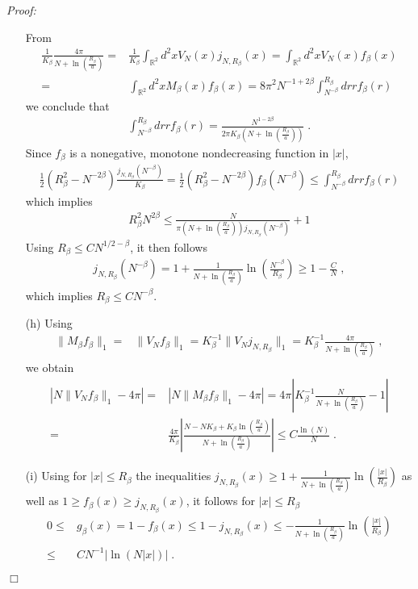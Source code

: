 \documentclass[11pt, english, american]{article}
\newenvironment{proof}{\emph{Proof:}}{\begin{flushright} $ \Box $ \end{flushright}}
\begin{document}
\begin{proof}
\begin{enumerate}
From
\begin{align*}
\frac{1}{K_\beta} \frac{4 \pi}{N+ \ln \left(\frac{R_\beta}{a}\right)}
=&
\frac{1}{K_\beta}
\int_{\mathbb{R}^2}d^2x V_N(x) j_{N,R_\beta}(x)
=
\int_{\mathbb{R}^2}d^2x V_N(x) f_\beta(x)
\\
=&
\int_{\mathbb{R}^2}d^2x M_\beta(x) f_\beta(x)
= 
8 \pi^2 N^{-1+2 \beta} 
\int_{N^{-\beta}}^{R_\beta} 
dr r f_\beta(r)
\end{align*}
we conclude that
\begin{align*}
\int_{N^{-\beta}}^{R_\beta} 
dr r f_\beta(r)
=
\frac{N^{1- 2 \beta}}{2 \pi K_\beta
\left(
N+ \ln \left(\frac{R_\beta}{a} \right)
\right)
} 
\;.
\end{align*}
Since $f_\beta$ is a nonegative, monotone nondecreasing function in $|x|$, 
\begin{align*}
\frac{1}{2}( R_\beta^2- N^{-2 \beta})
\frac{j_{N,R_\beta}(N^{-\beta})}{K_\beta}
=
\frac{1}{2}( R_\beta^2- N^{-2 \beta})
f_\beta(N^{-\beta})
\leq
\int_{N^{-\beta}}^{R_\beta} 
dr r f_\beta(r)
\end{align*}
which implies
\begin{align*}
R_\beta^2 N^{2 \beta}
\leq
\frac{N}{\pi 
 \left(N+ \ln \left(\frac{R_\beta}{a} \right) \right)
j_{N,R_\beta}(N^{-\beta})}+1
\end{align*}
Using $R_\beta\leq C N^{1/2- \beta}$, it then follows
\begin{align*}
 j_{N,R_\beta}(N^{-\beta})
 =
 1+   \frac{1}{N+ \ln \left(\frac{R_\beta}{a}\right)} \ln \left( \frac{N^{-\beta}}{R_\beta} \right)
 \geq 1- \frac{C}{N}
 \;,
\end{align*}
which implies $R_\beta \leq C N^{-\beta}$.


\item[(h)]
Using
\begin{align*}
\| M_\beta f_\beta\|_1=&
\| V_N f_\beta \|_1 = K_\beta^ {-1} \|V_N j_{N,R_\beta} \|_1
=
K_\beta^{-1}  \frac{4 \pi}{N+ \ln \left(\frac{R_\beta}{a}\right)}
\;,
\end{align*}
we obtain
\begin{align*}
|N\| V_N f_\beta\|_1- 4\pi|
=&
|N\| M_\beta f_\beta\|_1- 4\pi|
=
4 \pi
\left| K_\beta^{-1}  \frac{N}{N+ \ln \left(\frac{R_\beta}{a}\right)}-1 \right|
\\
=&
\frac{4 \pi}{K_\beta}
\left| \frac{
N-NK_\beta+K_\beta
\ln \left(\frac{R_\beta}{a}\right)}{N+ \ln \left(\frac{R_\beta}{a}\right)} \right|
\leq C \frac{\ln(N)}{N}
\;.
\end{align*}


\item[(i)]
Using for $|x| \leq R_\beta$ the inequalities
$j_{N,R_\beta}(x) \geq 1+
 \frac{1}{N+ \ln \left(\frac{R_\beta}{a}\right)}
 \ln \left( \frac{|x|}{R_\beta} \right) $ 
as well as $1\ge f_{\beta}(x) \geq j_{N,R_\beta}(x)$,  it follows for $|x| \leq R_\beta$ 
\begin{align*}
0\leq& g_{\beta}(x) = 1- f_{\beta}(x) \le 1- j_{N,R_\beta}(x)
\leq -
 \frac{1}{N+ \ln \left(\frac{R_\beta}{a}\right)}
 \ln \left( \frac{|x|}{R_\beta} \right) 
 \nonumber
\\
\label{gbound} 
 \leq&
 C N^ {-1}
  | 
  \ln \left(N |x| \right) 
  |
 \;.
\end{align*}


\end{enumerate}
\end{proof}
\end{document}
